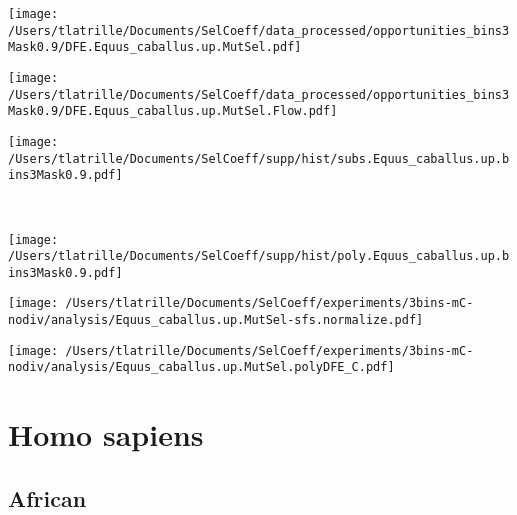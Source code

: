 \documentclass{article}
\begin{document}
    \begin{minipage}{0.32\linewidth}
        \texttt{[image: /Users/tlatrille/Documents/SelCoeff/data\_processed/opportunities\_bins3Mask0.9/DFE.Equus\_caballus.up.MutSel.pdf]}
    \end{minipage}
    \begin{minipage}{0.32\linewidth}
        \texttt{[image: /Users/tlatrille/Documents/SelCoeff/data\_processed/opportunities\_bins3Mask0.9/DFE.Equus\_caballus.up.MutSel.Flow.pdf]}
    \end{minipage}
    \begin{minipage}{0.32\linewidth}
        \texttt{[image: /Users/tlatrille/Documents/SelCoeff/supp/hist/subs.Equus\_caballus.up.bins3Mask0.9.pdf]}
    \end{minipage}
    \\
    \begin{minipage}{0.32\linewidth}
        \texttt{[image: /Users/tlatrille/Documents/SelCoeff/supp/hist/poly.Equus\_caballus.up.bins3Mask0.9.pdf]}
    \end{minipage}
    \begin{minipage}{0.32\linewidth}
        \texttt{[image: /Users/tlatrille/Documents/SelCoeff/experiments/3bins-mC-nodiv/analysis/Equus\_caballus.up.MutSel-sfs.normalize.pdf]}
    \end{minipage}
    \begin{minipage}{0.32\linewidth}
        \texttt{[image: /Users/tlatrille/Documents/SelCoeff/experiments/3bins-mC-nodiv/analysis/Equus\_caballus.up.MutSel.polyDFE\_C.pdf]}
    \end{minipage}
    \section{Homo sapiens}

    \subsection{African}
\end{document}
